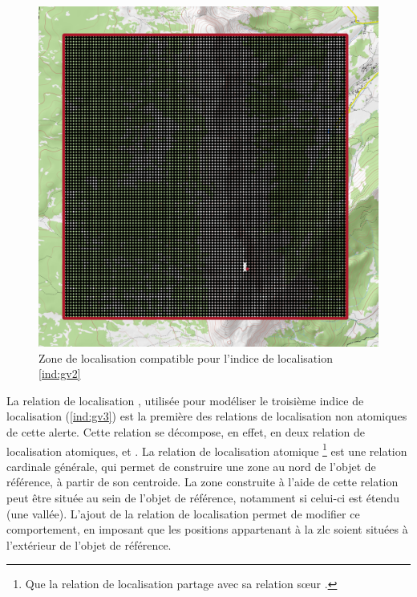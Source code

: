 \begin{figure}
  \centering
  \includegraphics{./figures/Sous_GrandVeymont.png}
  \caption{Zone de localisation compatible pour l'indice de
    localisation \ref{ind:gv2}}
  \label{fig:ZLC_GrandVeymont_2}
\end{figure}


La relation de localisation ,
utilisée pour modéliser le troisième indice de localisation
(\ref{ind:gv3}) est la première des relations de localisation non
atomiques de cette alerte. Cette relation se décompose, en effet, en
deux relation de localisation atomiques,  et
. La relation de localisation
atomique  \footnote{Que la relation de
  localisation \protect{} partage avec
  sa relation sœur \protect{}.}
est une relation cardinale générale, qui permet de construire une zone
au nord de l'objet de référence, à partir de son centroide. La zone
construite à l'aide de cette relation peut être située au sein de
l'objet de référence, notamment si celui-ci est étendu (\eg une
vallée). L'ajout de la relation de localisation
 permet de modifier ce
comportement, en imposant que les positions appartenant à la \ac{zlc}
soient situées à l'extérieur de l'objet de référence.

